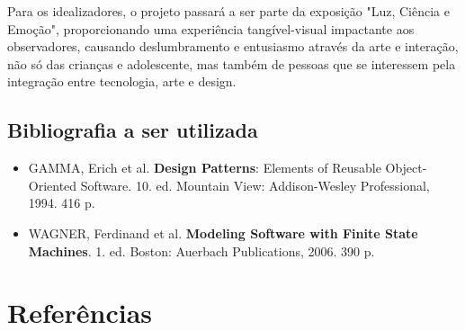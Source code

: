 \documentclass[a4paper,12pt]{article}
\begin{document}
Para os idealizadores, o projeto passará a ser parte da exposição "Luz, Ciência e Emoção", proporcionando uma experiência tangível-visual impactante aos observadores, causando deslumbramento e entusiasmo através da arte e interação, não só das crianças e adolescente, mas também de pessoas que se interessem pela integração entre tecnologia, arte e design.

\subsection{Bibliografia a ser utilizada}

\begin{itemize}
    \item GAMMA, Erich et al. \textbf{Design Patterns}: Elements of Reusable Object-Oriented Software. 10. ed. Mountain View: Addison-Wesley Professional, 1994. 416 p.
    
    \item WAGNER, Ferdinand et al. \textbf{Modeling Software with Finite State Machines}. 1. ed. Boston: Auerbach Publications, 2006. 390 p.
\end{itemize}

 \clearpage
  
  
  \clearpage
  \section{Referências}
  \printbibliography
\end{document}
